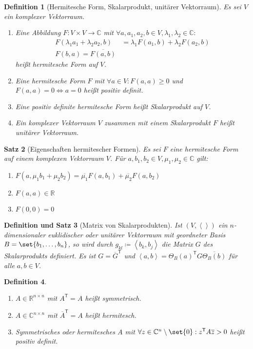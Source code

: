 \documentclass[a4paper]{article}
\newcounter{Sec}
\theoremstyle{marginbreak}
\newtheorem{definition}{Definition}[Sec]
\newtheorem{satz}[definition]{Satz}
\newtheorem{defsatz}[definition]{Definition und Satz}
\newcommand\conj{\overline}
\newcommand\scp[1]{\left\langle#1\right\rangle}
\newcommand\transpose[1]{#1^{\mathsf{T}}}
\begin{document}
	\begin{definition}[Hermitesche Form, Skalarprodukt, unitärer Vektorraum]
		Es sei $V$ ein komplexer Vektorraum.
		\begin{enumerate}[label=(\alph*)]
			\item Eine Abbildung $F\colon V\times V\to\mathbb{C}$ mit
				$\forall a, a_1, a_2, b\in V, \lambda_1, \lambda_2\in\mathbb{C}\colon$
				\begin{align*}
					F(\lambda_1 a_1+\lambda_2 	a_2, b) &= \lambda_1 F(a_1, b) + \lambda_2 F(a_2, b)\\
					F(b, a) = \conj{F(a, b)}
				\end{align*}
				heißt hermitesche Form auf $V$.
			\item Eine hermitesche Form $F$ mit $\forall a\in V\colon F(a, a)\geq 0$ und $F(a, a) = 0\iff a = 0$
				heißt positiv definit.
			\item Eine positiv definite hermitesche Form heißt Skalarprodukt auf $V$.
			\item Ein komplexer Vektorraum $V$ zusammen mit einem Skalarprodukt $F$ heißt unitärer Vektorraum.
		\end{enumerate}
	\end{definition}
	\begin{satz}[Eigenschaften hermitescher Formen]
		Es sei $F$ eine hermitesche Form auf einem komplexen Vektorraum $V$. Für
		$a, b_1, b_2\in V, \mu_1, \mu_2\in\mathbb{C}$ gilt:
		\begin{enumerate}[label=(\alph*)]
			\item $F(a, \mu_1 b_1+ \mu_2 b_2) = \conj{\mu_1} F(a, b_1) + \conj{\mu_2} F(a, b_2)$
			\item $F(a, a)\in\mathbb{R}$
			\item $F(0, 0) = 0$
		\end{enumerate}
	\end{satz}
	\begin{defsatz}[Matrix von Skalarprodukten]
		Ist $(V, \scp{})$ ein $n$-dimensionaler euklidischer oder unitärer
		Vektorraum mit geordneter Basis $B = \set{b_1,\ldots,b_n}$, so wird durch
		$g_{kl}\coloneqq \scp{b_k, b_j}$ die Matrix $G$ des Skalarprodukts definiert.
		Es ist $G = \transpose{\conj{G}}$ und $\scp{a, b} = \transpose{\Theta_B(a)}G\conj{\Theta_B(b)}$
		für alle $a, b\in V$.
	\end{defsatz}
	\begin{definition}
		\begin{enumerate}[label=(\alph*)]
			\item $A\in\mathbb{R}^{n\times n}$ mit $\transpose{A} = A$ heißt symmetrisch.
			\item $A\in\mathbb{C}^{n\times n}$ mit $\transpose{\conj{A}} = A$ heißt hermitesch.
			\item Symmetrisches oder hermitesches $A$ mit $\forall z\in\mathbb{C}^n\setminus\set{0}:
				\transpose{z}A\conj{z}>0$ heißt positiv definit.
		\end{enumerate}
	\end{definition}
\end{document}
